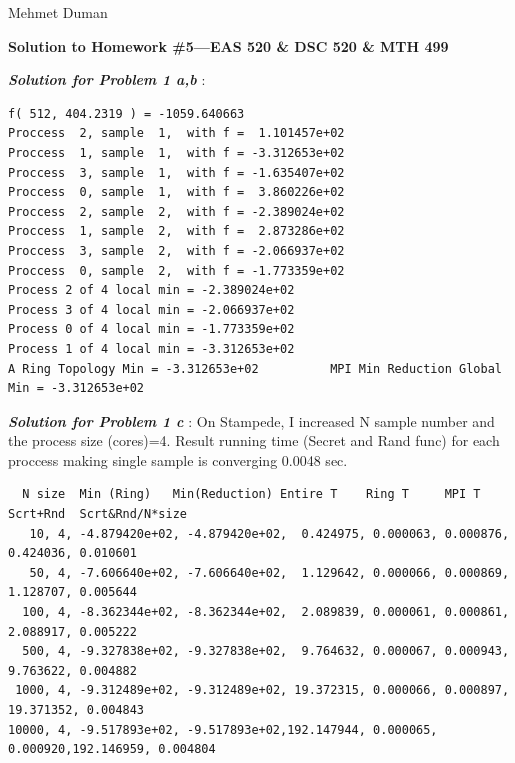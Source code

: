 \documentclass{article}
\begin{document}
\begin{flushright}
Mehmet Duman
\end{flushright}
\begin{center}
{\Large {\bf Solution to Homework \#5---EAS 520 \& DSC 520 \& MTH 499} }
\end{center}

\textbf{\textit{Solution for Problem 1 a,b}} :
\begin{lstlisting}
f( 512, 404.2319 ) = -1059.640663 
Proccess  2, sample  1,  with f =  1.101457e+02 
Proccess  1, sample  1,  with f = -3.312653e+02 
Proccess  3, sample  1,  with f = -1.635407e+02 
Proccess  0, sample  1,  with f =  3.860226e+02 
Proccess  2, sample  2,  with f = -2.389024e+02 
Proccess  1, sample  2,  with f =  2.873286e+02 
Proccess  3, sample  2,  with f = -2.066937e+02 
Proccess  0, sample  2,  with f = -1.773359e+02 
Process 2 of 4 local min = -2.389024e+02
Process 3 of 4 local min = -2.066937e+02
Process 0 of 4 local min = -1.773359e+02
Process 1 of 4 local min = -3.312653e+02
A Ring Topology Min = -3.312653e+02          MPI Min Reduction Global Min = -3.312653e+02 
\end{lstlisting}

\textbf{\textit{Solution for Problem 1 c}} : On Stampede, I increased N sample number and  the process size (cores)=4. Result running time (Secret and Rand func)  for each proccess making single sample is converging  0.0048 sec.

\begin{lstlisting}
  N size  Min (Ring)   Min(Reduction) Entire T    Ring T     MPI T    Scrt+Rnd  Scrt&Rnd/N*size
   10, 4, -4.879420e+02, -4.879420e+02,  0.424975, 0.000063, 0.000876,  0.424036, 0.010601
   50, 4, -7.606640e+02, -7.606640e+02,  1.129642, 0.000066, 0.000869,  1.128707, 0.005644
  100, 4, -8.362344e+02, -8.362344e+02,  2.089839, 0.000061, 0.000861,  2.088917, 0.005222
  500, 4, -9.327838e+02, -9.327838e+02,  9.764632, 0.000067, 0.000943,  9.763622, 0.004882
 1000, 4, -9.312489e+02, -9.312489e+02, 19.372315, 0.000066, 0.000897, 19.371352, 0.004843
10000, 4, -9.517893e+02, -9.517893e+02,192.147944, 0.000065, 0.000920,192.146959, 0.004804
\end{lstlisting}
\end{document}
